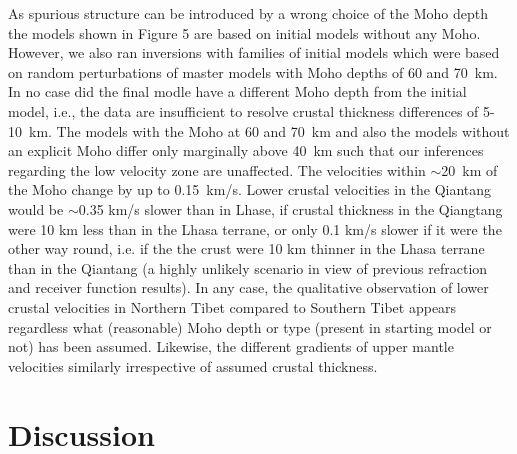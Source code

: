 \documentclass[12pt]{article}
\begin{document}
As spurious structure can be introduced by a wrong choice of the
Moho depth the models shown in Figure 5 are based on initial models
without any Moho.  However, we also ran inversions with families of
initial models which were based on random perturbations of master
models with Moho depths of 60 and 70~km.  In no case did the final
modle have a different Moho depth from the initial model, i.e., the
data are insufficient to resolve crustal thickness differences of
5-10~km.  The models with the Moho at 60 and 70~km and also the models
without an explicit Moho differ only marginally above 40~km such that
our inferences regarding the low velocity zone are unaffected.  The
velocities within $\sim$20~km of the Moho change by up to 0.15~km/s.
Lower crustal velocities in the Qiantang would be $\sim$0.35 km/s
slower than in Lhase, if crustal thickness in the Qiangtang were 10 km
less than in the Lhasa terrane, or only 0.1 km/s slower if it were the
other way round, i.e. if the the crust were 10 km thinner in the Lhasa
terrane than in the Qiantang (a highly unlikely scenario in view of
previous refraction and receiver function results).  In any case, the
qualitative observation of lower crustal velocities in Northern Tibet
compared to Southern Tibet appears regardless what (reasonable) Moho
depth or type (present in starting model or not) has been assumed.  Likewise, the different gradients of upper mantle velocities similarly irrespective of assumed crustal thickness.

\section{Discussion}
\end{document}
